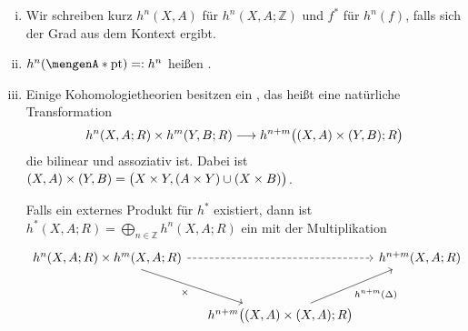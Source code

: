 \begin{enumerate}[(i)]
	\item Wir schreiben kurz $h^n(X,A)$ für $h^n(X,A;\mathds{Z})$ und $f^*$ für $h^n(f)$, falls sich der Grad aus dem Kontext ergibt. 
	\item $h^n(\set{\mathrm{pt}}) =: h^n$ heißen .
	\item Einige Kohomologietheorien besitzen ein , das heißt eine natürliche Transformation
	\[
		h^n(X,A;R) \times h^m(Y,B;R) \longrightarrow h^{n+m} \enbrace[\big]{(X,A) \times (Y,B);R} 
	\]
	die bilinear und assoziativ ist. 
	Dabei ist $(X,A) \times (Y,B) = \enbrace[\big]{X \times Y, (A \times Y) \cup (X \times B)}$.
	
	Falls ein externes Produkt für $h^*$ existiert, dann ist $h^*(X,A;R) = \bigoplus_{n \in \mathds{Z}} h^n(X,A;R)$ ein  mit der Multiplikation 
	\[
		\begin{tikzcd}[row sep=large, column sep=small]
			h^n(X,A;R) \times h^m(X,A;R) \arrow[dashed]{rr} \arrow["\times"']{dr} & & h^{n+m}(X,A;R) \\
			& h^{n+m} \enbrace[\big]{(X,A) \times (X,A);R} \arrow["h^{n+m}(\Delta)"']{ur} &
		\end{tikzcd}
	\]
\end{enumerate}

